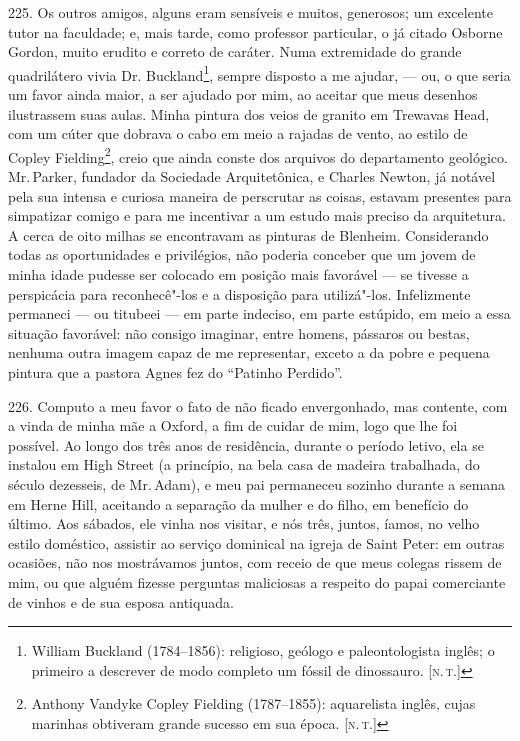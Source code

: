 225. Os outros amigos, alguns eram sensíveis e muitos, generosos; um
excelente tutor na faculdade; e, mais tarde, como professor particular,
o já citado Osborne Gordon, muito erudito e correto de caráter. Numa
extremidade do grande quadrilátero vivia Dr. Buckland\footnote{William
  Buckland (1784--1856): religioso, geólogo e paleontologista inglês; o
  primeiro a descrever de modo completo um fóssil de dinossauro. {[}\textsc{n.\,t.}{]}}, sempre disposto a me ajudar, --- ou, o que seria um favor
ainda maior, a ser ajudado por mim, ao aceitar que meus desenhos
ilustrassem suas aulas. Minha pintura dos veios de granito em Trewavas
Head, com um cúter que dobrava o cabo em meio a rajadas de vento, ao
estilo de Copley Fielding\footnote{Anthony Vandyke Copley Fielding
  (1787--1855): aquarelista inglês, cujas marinhas obtiveram grande
  sucesso em sua época. {[}\textsc{n.\,t.}{]}}, creio que ainda conste dos
arquivos do departamento geológico. Mr.\,Parker, fundador da Sociedade
Arquitetônica, e Charles Newton, já notável pela sua intensa e curiosa
maneira de perscrutar as coisas, estavam presentes para simpatizar
comigo e para me incentivar a um estudo mais preciso da arquitetura. A
cerca de oito milhas se encontravam as pinturas de Blenheim.
Considerando todas as oportunidades e privilégios, não poderia conceber
que um jovem de minha idade pudesse ser colocado em posição mais
favorável --- se tivesse a perspicácia para reconhecê"-los e a disposição
para utilizá"-los. Infelizmente permaneci --- ou titubeei --- em parte
indeciso, em parte estúpido, em meio a essa situação favorável: não
consigo imaginar, entre homens, pássaros ou bestas, nenhuma outra imagem
capaz de me representar, exceto a da pobre e pequena pintura que a
pastora Agnes fez do ``Patinho Perdido''.

226. Computo a meu favor o fato de não ficado envergonhado, mas
contente, com a vinda de minha mãe a Oxford, a fim de cuidar de mim,
logo que lhe foi possível. Ao longo dos três anos de residência, durante
o período letivo, ela se instalou em High Street (a princípio, na bela
casa de madeira trabalhada, do século dezesseis, de Mr.\,Adam), e meu pai
permaneceu sozinho durante a semana em Herne Hill, aceitando a separação
da mulher e do filho, em benefício do último. Aos sábados, ele vinha nos
visitar, e nós três, juntos, íamos, no velho estilo doméstico, assistir
ao serviço dominical na igreja de Saint Peter: em outras ocasiões, não
nos mostrávamos juntos, com receio de que meus colegas rissem de mim, ou
que alguém fizesse perguntas maliciosas a respeito do papai comerciante
de vinhos e de sua esposa antiquada.


